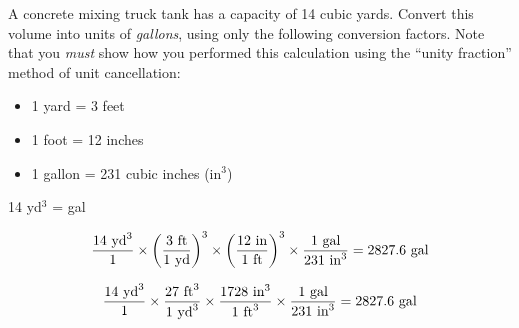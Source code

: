 

A concrete mixing truck tank has a capacity of 14 cubic yards.  Convert this volume into units of {\it gallons}, using only the following conversion factors.  Note that you {\it must} show how you performed this calculation using the ``unity fraction'' method of unit cancellation:

\begin{itemize}
\item{} 1 yard = 3 feet
\item{} 1 foot = 12 inches
\item{} 1 gallon = 231 cubic inches (in$^{3}$)
\end{itemize}

14 yd$^{3}$ = \underbar{\hskip 50pt} gal







$${14 \hbox{ yd}^3 \over 1} \times \left({3 \hbox{ ft} \over 1 \hbox{ yd}}\right)^3 \times \left({12 \hbox{ in} \over 1 \hbox{ ft}}\right)^3 \times {1 \hbox{ gal} \over 231 \hbox{ in}^3} = 2827.6 \hbox{ gal}$$

$${14 \hbox{ yd}^3 \over 1} \times {27 \hbox{ ft}^3 \over 1 \hbox{ yd}^3} \times {1728 \hbox{ in}^3 \over 1 \hbox{ ft}^3} \times {1 \hbox{ gal} \over 231 \hbox{ in}^3} = 2827.6 \hbox{ gal}$$











